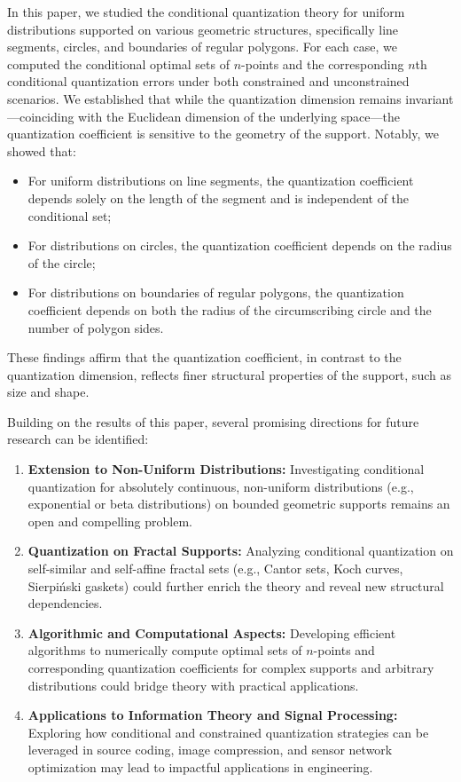 \documentclass[12pt, reqno]{amsart}
\theoremstyle{plain}
\theoremstyle{definition}
\begin{document}
In this paper, we studied the conditional quantization theory for uniform distributions supported on various geometric structures, specifically line segments, circles, and boundaries of regular polygons. For each case, we computed the conditional optimal sets of $n$-points and the corresponding $n$th conditional quantization errors under both constrained and unconstrained scenarios. We established that while the quantization dimension remains invariant---coinciding with the Euclidean dimension of the underlying space---the quantization coefficient is sensitive to the geometry of the support. Notably, we showed that:
\begin{itemize}
    \item For uniform distributions on line segments, the quantization coefficient depends solely on the length of the segment and is independent of the conditional set;
    \item For distributions on circles, the quantization coefficient depends on the radius of the circle;
    \item For distributions on boundaries of regular polygons, the quantization coefficient depends on both the radius of the circumscribing circle and the number of polygon sides.
\end{itemize}

These findings affirm that the quantization coefficient, in contrast to the quantization dimension, reflects finer structural properties of the support, such as size and shape.


Building on the results of this paper, several promising directions for future research can be identified:

\begin{enumerate}
    \item \textbf{Extension to Non-Uniform Distributions:} Investigating conditional quantization for absolutely continuous, non-uniform distributions (e.g., exponential or beta distributions) on bounded geometric supports remains an open and compelling problem.

    \item \textbf{Quantization on Fractal Supports:} Analyzing conditional quantization on self-similar and self-affine fractal sets (e.g., Cantor sets, Koch curves, Sierpiński gaskets) could further enrich the theory and reveal new structural dependencies.

    \item \textbf{Algorithmic and Computational Aspects:} Developing efficient algorithms to numerically compute optimal sets of $n$-points and corresponding quantization coefficients for complex supports and arbitrary distributions could bridge theory with practical applications.

    \item \textbf{Applications to Information Theory and Signal Processing:} Exploring how conditional and constrained quantization strategies can be leveraged in source coding, image compression, and sensor network optimization may lead to impactful applications in engineering.
\end{enumerate}
\end{document}
